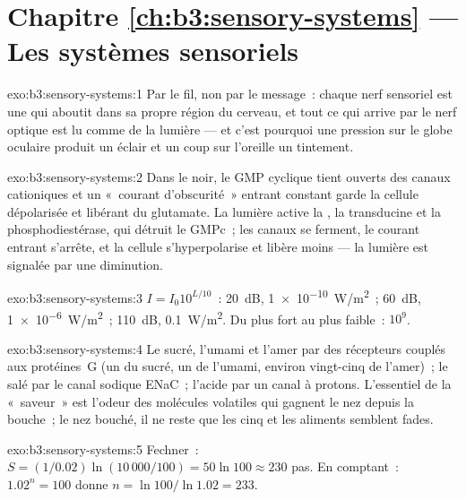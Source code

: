 \section*{Chapitre \ref{ch:b3:sensory-systems} --- Les systèmes sensoriels}

\begin{solution}{exo:b3:sensory-systems:1}
Par le fil, non par le message~: chaque nerf sensoriel est une  qui aboutit dans sa propre région du cerveau, et tout ce qui
arrive par le nerf optique est lu comme de la lumière --- et c'est
pourquoi une pression sur le globe oculaire produit un éclair et un coup
sur l'oreille un tintement.
\end{solution}

\begin{solution}{exo:b3:sensory-systems:2}
Dans le noir, le GMP cyclique tient ouverts des canaux cationiques et un
«~courant d'obscurité~» entrant constant garde la cellule dépolarisée et
libérant du glutamate. La lumière active la , la transducine
et la phosphodiestérase, qui détruit le GMPc~; les canaux se ferment, le
courant entrant s'arrête, et la cellule s'hyperpolarise et libère moins
--- la lumière est signalée par une diminution.
\end{solution}

\begin{solution}{exo:b3:sensory-systems:3}
$I = I_{0}10^{L/10}$~: \qty{20}{dB}, \qty{1e-10}{W/m^2}~; \qty{60}{dB},
\qty{1e-6}{W/m^2}~; \qty{110}{dB}, \qty{0.1}{W/m^2}. Du plus fort au
plus faible~: $10^{9}$.
\end{solution}

\begin{solution}{exo:b3:sensory-systems:4}
Le sucré, l'umami et l'amer par des récepteurs couplés aux protéines~G
(un du sucré, un de l'umami, environ vingt-cinq de l'amer)~; le salé par
le canal sodique ENaC~; l'acide par un canal à protons. L'essentiel de
la «~saveur~» est l'odeur des molécules volatiles qui gagnent le nez
depuis la bouche~; le nez bouché, il ne reste que les cinq  et les
aliments semblent fades.
\end{solution}

\begin{solution}{exo:b3:sensory-systems:5}
Fechner~: $S = (1/0.02)\ln(10\,000/100) = 50\ln 100 \approx 230$ pas. En
comptant~: $1.02^{n} = 100$ donne $n = \ln 100/\ln 1.02 = 233$.
\end{solution}

